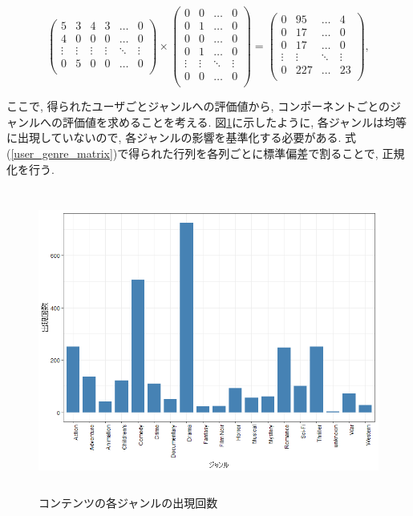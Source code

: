 \documentclass[a4j,12pt]{jarticle}
\begin{document}
\begin{equation}
\label{user_genre_matrix}
\begin{pmatrix} 
5 & 3 & 4 & 3 & \ldots & 0 \\
4 & 0 & 0 & 0 & \ldots & 0 \\
\vdots & \vdots & \vdots & \vdots & \ddots & \vdots \\
0 & 5 & 0 & 0 & \ldots & 0 \\
\end{pmatrix} 
\times
\begin{pmatrix} 
0 & 0 & \ldots & 0 \\
0 & 1 & \ldots & 0 \\
0 & 0 & \ldots & 0 \\
0 & 1 & \ldots & 0 \\
\vdots & \vdots & \ddots & \vdots \\
0 & 0 & \ldots & 0 \\
\end{pmatrix}
=
\begin{pmatrix} 
0 & 95 & \ldots & 4 \\
0 & 17 & \ldots & 0 \\
0 & 17 & \ldots & 0 \\
\vdots & \vdots & \ddots & \vdots \\
0 & 227 & \ldots & 23 \\
\end{pmatrix},
\end{equation}

\noindent
ここで, 得られたユーザごとジャンルへの評価値から, コンポーネントごとのジャンルへの評価値を求めることを考える. 図\ref{genre_count}に示したように, 各ジャンルは均等に出現していないので, 各ジャンルの影響を基準化する必要がある. 式(\ref{user_genre_matrix})で得られた行列を各列ごとに標準偏差で割ることで, 正規化を行う. 

\begin{figure}[H]
\begin{center}
\includegraphics[clip,height= 100mm]{data/genre_count.png}
\end{center}
\caption{コンテンツの各ジャンルの出現回数}
\label{genre_count}
\end{figure}
\end{document}
